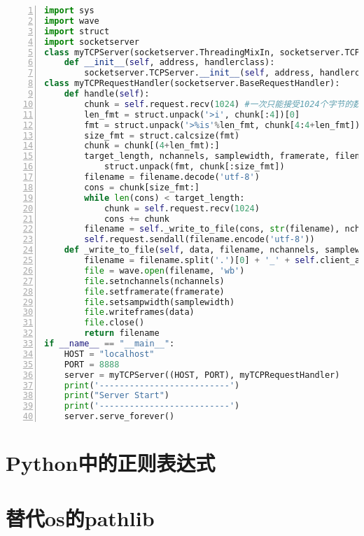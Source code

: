 \begin{lstlisting}[language = python, caption={音频传输的server端代码}, label={lst:sendsave-wave-server}, numbers=left, 
       numberstyle=\tiny,keywordstyle=\color{blue!70},
       commentstyle=\color{red!50!green!50!blue!50},frame=shadowbox,
       rulesepcolor=\color{red!20!green!20!blue!20},basicstyle=\ttfamily]
import sys
import wave
import struct
import socketserver
class myTCPServer(socketserver.ThreadingMixIn, socketserver.TCPServer):
    def __init__(self, address, handlerclass):
        socketserver.TCPServer.__init__(self, address, handlerclass)
class myTCPRequestHandler(socketserver.BaseRequestHandler):
    def handle(self):
        chunk = self.request.recv(1024) #一次只能接受1024个字节的数据，其他的会继续传过来
        len_fmt = struct.unpack('>i', chunk[:4])[0] 
        fmt = struct.unpack('>%is'%len_fmt, chunk[4:4+len_fmt])[0].decode('utf-8') 
        size_fmt = struct.calcsize(fmt)
        chunk = chunk[(4+len_fmt):]
        target_length, nchannels, samplewidth, framerate, filename = \
            struct.unpack(fmt, chunk[:size_fmt])
        filename = filename.decode('utf-8')
        cons = chunk[size_fmt:]
        while len(cons) < target_length:
            chunk = self.request.recv(1024)
            cons += chunk
        filename = self._write_to_file(cons, str(filename), nchannels, samplewidth, framerate)
        self.request.sendall(filename.encode('utf-8'))
    def _write_to_file(self, data, filename, nchannels, samplewidth, framerate):
        filename = filename.split('.')[0] + '_' + self.client_address[0] + '.wav'
        file = wave.open(filename, 'wb')
        file.setnchannels(nchannels)
        file.setframerate(framerate)
        file.setsampwidth(samplewidth)
        file.writeframes(data)
        file.close()
        return filename
if __name__ == "__main__":
    HOST = "localhost"
    PORT = 8888
    server = myTCPServer((HOST, PORT), myTCPRequestHandler)
    print('--------------------------')
    print("Server Start")
    print('--------------------------')
    server.serve_forever()
\end{lstlisting}

\section{Python中的正则表达式}

\section{替代os的pathlib}


